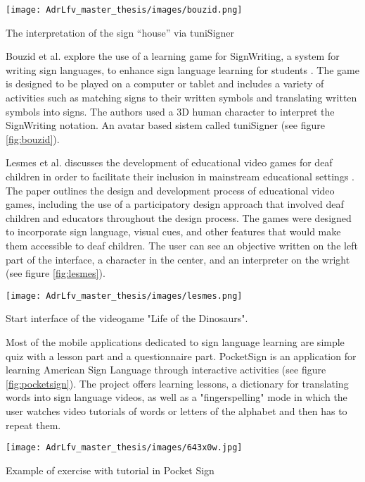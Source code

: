 \begin{marginfigure}
    \centering
    \texttt{[image: AdrLfv\_master\_thesis/images/bouzid.png]}
    \caption{The interpretation of the sign “house” via tuniSigner}
    \label{fig:bouzid}
\end{marginfigure}

Bouzid et al. explore the use of a learning game for SignWriting, a system for writing sign languages, to enhance sign language learning for students \cite{bouzid2016using}. The game is designed to be played on a computer or tablet and includes a variety of activities such as matching signs to their written symbols and translating written symbols into signs. The authors used a 3D human character to interpret the SignWriting notation. An avatar based sistem called tuniSigner \cite{bouzid2013avatar} (see figure \ref{fig:bouzid}).

Lesmes et al. discusses the development of educational video games for deaf children in order to facilitate their inclusion in mainstream educational settings \cite{lesmes2022design}. 
The paper outlines the design and development process of educational video games, including the use of a participatory design approach that involved deaf children and educators throughout the design process. 
The games were designed to incorporate sign language, visual cues, and other features that would make them accessible to deaf children. The user can see an objective written on the left part of the interface, a character in the center, and an interpreter on the wright (see figure \ref{fig:lesmes}).

\begin{marginfigure}
    \centering
    \texttt{[image: AdrLfv\_master\_thesis/images/lesmes.png]}
    \caption{Start interface of the videogame "Life of the Dinosaurs".}
    \label{fig:lesmes}
\end{marginfigure}

Most of the mobile applications dedicated to sign language learning are simple quiz with a lesson part and a questionnaire part. PocketSign is an application for learning American Sign Language through interactive activities (see figure \ref{fig:pocketsign}). 
The project offers learning lessons, a dictionary for translating words into sign language videos, as well as a "fingerspelling" mode in which the user watches video tutorials of words or letters of the alphabet and then has to repeat them. 

\begin{marginfigure}
    \centering
    \texttt{[image: AdrLfv\_master\_thesis/images/643x0w.jpg]}
    \caption{Example of exercise with tutorial in Pocket Sign}
    \label{fig:pocketsign}
\end{marginfigure}

